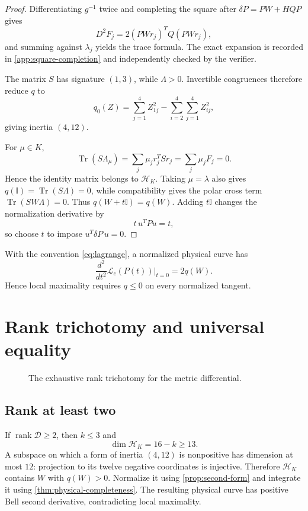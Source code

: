 \documentclass[11pt]{article}
\theoremstyle{definition}
\newcommand{\Tr}{\operatorname{Tr}}
\newcommand{\rank}{\operatorname{rank}}
\newcommand{\id}{\mathbb I}
\newcommand{\cD}{\mathcal D}
\begin{document}
\begin{proof}
Differentiating \(g^{-1}\) twice and completing the square after
\(\delta P=PW+HQ P\) gives
\[
D^2F_j=2(PWr_j)^TQ(PWr_j),
\]
and summing against \(\lambda_j\) yields the trace formula. The exact
expansion is recorded in \cref{app:square-completion} and independently
checked by the verifier.

The matrix \(S\) has signature \((1,3)\), while \(\Lambda>0\).
Invertible congruences therefore reduce \(q\) to
\[
q_0(Z)=\sum_{j=1}^4Z_{1j}^2-
\sum_{i=2}^4\sum_{j=1}^4Z_{ij}^2,
\]
giving inertia \((4,12)\).

For \(\mu\in K\),
\[
\Tr(S\Lambda_\mu)=\sum_j\mu_jr_j^TSr_j
=\sum_j\mu_jF_j=0.
\]
Hence the identity matrix belongs to \(\mathcal H_K\). Taking
\(\mu=\lambda\) also gives \(q(\id)=\Tr(S\Lambda)=0\), while compatibility
gives the polar cross term \(\Tr(SW\Lambda)=0\). Thus
\(q(W+t\id)=q(W)\). Adding \(t\id\) changes the normalization derivative
by
\[
t\,u^TPu=t,
\]
so choose \(t\) to impose \(u^T\delta P\,u=0\).
\end{proof}

With the convention \eqref{eq:lagrange}, a normalized physical curve has
\[
\frac{d^2}{dt^2}\mathcal L_c(P(t))\big|_{t=0}=2q(W).
\]
Hence local maximality requires \(q\le0\) on every normalized tangent.

\section{Rank trichotomy and universal equality}
\label{sec:closure}

\begin{figure}[t]
\centering
\resizebox{\textwidth}{!}{}
\caption{The exhaustive rank trichotomy for the metric differential.}
\label{fig:trichotomy}
\end{figure}

\subsection{Rank at least two}

If \(\rank\cD\ge2\), then \(k\le3\) and
\[
\dim\mathcal H_K=16-k\ge13.
\]
A subspace on which a form of inertia \((4,12)\) is nonpositive has dimension
at most \(12\): projection to its twelve negative coordinates is injective.
Therefore \(\mathcal H_K\) contains \(W\) with \(q(W)>0\). Normalize it using
\cref{prop:second-form} and integrate it using
\cref{thm:physical-completeness}. The resulting physical curve has positive
Bell second derivative, contradicting local maximality.
\end{document}
